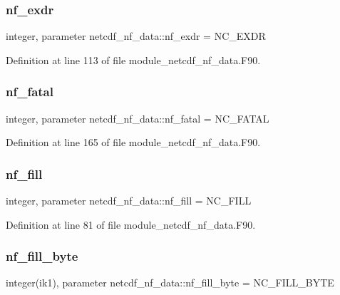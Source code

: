 \subsubsection{\texorpdfstring{nf\+\_\+exdr}{nf\_exdr}}
{\footnotesize\ttfamily integer, parameter netcdf\+\_\+nf\+\_\+data\+::nf\+\_\+exdr = N\+C\+\_\+\+E\+X\+DR}



Definition at line 113 of file module\+\_\+netcdf\+\_\+nf\+\_\+data.\+F90.

\mbox{\label{namespacenetcdf__nf__data_ac9327edbd57889437ca36e4c7a37a94b}} 
\subsubsection{\texorpdfstring{nf\+\_\+fatal}{nf\_fatal}}
{\footnotesize\ttfamily integer, parameter netcdf\+\_\+nf\+\_\+data\+::nf\+\_\+fatal = N\+C\+\_\+\+F\+A\+T\+AL}



Definition at line 165 of file module\+\_\+netcdf\+\_\+nf\+\_\+data.\+F90.

\mbox{\label{namespacenetcdf__nf__data_a45554206e759ae606aa467504278f3bc}} 
\subsubsection{\texorpdfstring{nf\+\_\+fill}{nf\_fill}}
{\footnotesize\ttfamily integer, parameter netcdf\+\_\+nf\+\_\+data\+::nf\+\_\+fill = N\+C\+\_\+\+F\+I\+LL}



Definition at line 81 of file module\+\_\+netcdf\+\_\+nf\+\_\+data.\+F90.

\mbox{\label{namespacenetcdf__nf__data_a2a64867aa9d38a8ff5cbd606ef0478f8}} 
\subsubsection{\texorpdfstring{nf\+\_\+fill\+\_\+byte}{nf\_fill\_byte}}
{\footnotesize\ttfamily integer(ik1), parameter netcdf\+\_\+nf\+\_\+data\+::nf\+\_\+fill\+\_\+byte = N\+C\+\_\+\+F\+I\+L\+L\+\_\+\+B\+Y\+TE}



